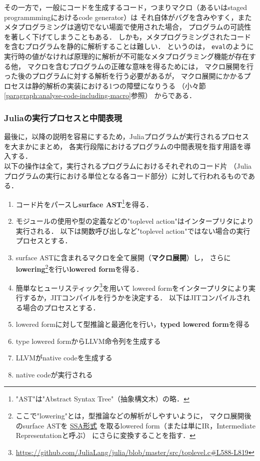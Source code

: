 その一方で，一般にコードを生成するコード，つまりマクロ（あるいはstaged programmmingにおけるcode generator）は
それ自体がバグを含みやすく，またメタプログラミングは適切でない場面で使用された場合，
プログラムの可読性を著しく下げてしまうこともある．
しかも，メタプログラミングされたコードを含むプログラムを静的に解析することは難しい．
というのは，
\verb|eval|のように実行時の値がなければ原理的に解析が不可能なメタプログラミング機能が存在する他，
マクロを含むプログラムの正確な意味を得るためには，
マクロ展開を行った後のプログラムに対する解析を行う必要があるが，
マクロ展開にかかるプロセスは静的解析の実装における1つの障壁になりうる
（小々節\ref{paragraph:analyse-code-including-macro}参照）
からである．

\subsubsection{Juliaの実行プロセスと中間表現} \label{subsubsection:eval-process}

最後に，以降の説明を容易にするため，Juliaプログラムが実行されるプロセスを大まかにまとめ，
各実行段階におけるプログラムの中間表現を指す用語を導入する\cite{eval-of-julia-code, julia-asts}．\\

以下の操作は全て，実行されるプログラムにおけるそれぞれのコード片
（Juliaプログラムの実行における単位となる各コード部分）に対して行われるものである．

\begin{enumerate}
  \item コード片をパースし\textbf{surface AST}\footnote{
          "AST"は"Abstract Syntax Tree"（抽象構文木）の略．
        }を得る．
  \item モジュールの使用や型の定義などの"toplevel action"はインタープリタにより実行される．
        以下は関数呼び出しなど"toplevel action"ではない場合の実行プロセスとする．
  \item surface ASTに含まれるマクロを全て展開（\textbf{マクロ展開}）し，
        さらに\textbf{lowering}\footnote{
          ここで"lowering"とは，型推論などの解析がしやすいように，
          マクロ展開後のsurface ASTを
          \href{https://docs.julialang.org/en/latest/devdocs/ssair/}{SSA形式}
          を取るlowered form（または単にIR，Intermediate Representationと呼ぶ）
          にさらに変換することを指す．
        }を行い\textbf{lowered form}を得る．
  \item 簡単なヒューリスティック\footnote{
          \url{https://github.com/JuliaLang/julia/blob/master/src/toplevel.c\#L588-L819}
        }を用いて
        lowered formをインタープリタにより実行するか，JITコンパイルを行うかを決定する．
        以下はJITコンパイルされる場合のプロセスとする．
  \item lowered formに対して型推論と最適化を行い，\textbf{typed lowered form}を得る
  \item type lowered formからLLVM命令列を生成する
  \item LLVMがnative codeを生成する
  \item native codeが実行される
\end{enumerate}


